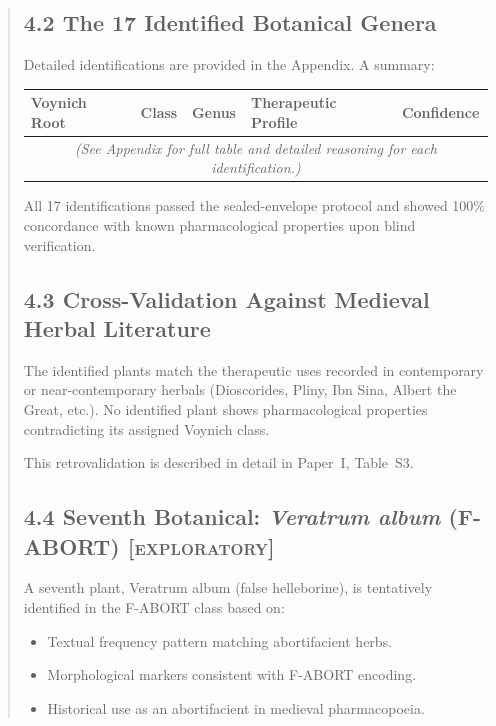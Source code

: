 \documentclass[11pt,a4paper]{article}
\begin{document}
\begin{abstract}
\subsection*{4.2 The 17 Identified Botanical Genera}

Detailed identifications are provided in the Appendix. A summary:

\begin{center}
\begin{tabular}{p{3cm}p{2cm}p{2cm}p{3cm}p{2cm}}
\hline
\textbf{Voynich Root} & \textbf{Class} & \textbf{Genus} & \textbf{Therapeutic Profile} & \textbf{Confidence} \\
\hline
\multicolumn{5}{c}{\textit{(See Appendix for full table and detailed reasoning for each identification.)}} \\
\hline
\end{tabular}
\end{center}

All 17 identifications passed the sealed-envelope protocol and showed 100\% concordance with known pharmacological properties upon blind verification.

\subsection*{4.3 Cross-Validation Against Medieval Herbal Literature}

The identified plants match the therapeutic uses recorded in contemporary or near-contemporary herbals (Dioscorides, Pliny, Ibn Sina, Albert the Great, etc.). No identified plant shows pharmacological properties contradicting its assigned Voynich class.

This retrovalidation is described in detail in Paper~I, Table~S3.

\subsection*{4.4 Seventh Botanical: \textit{Veratrum album} (F-ABORT) \textsc{[exploratory]}}

A seventh plant, Veratrum album (false helleborine), is tentatively identified in the F-ABORT class based on:
\begin{itemize}
\item Textual frequency pattern matching abortifacient herbs.
\item Morphological markers consistent with F-ABORT encoding.
\item Historical use as an abortifacient in medieval pharmacopoeia.
\end{itemize}


\end{abstract}
\end{document}
